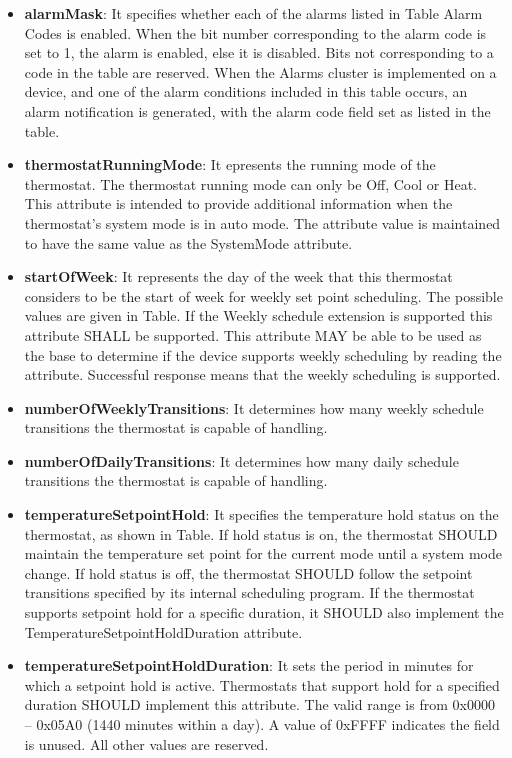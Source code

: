 \begin{itemize}
\item \textbf{alarmMask}: It specifies whether each of the alarms listed in Table Alarm Codes is enabled. When the bit number corresponding to the alarm code is set to 1, the alarm is enabled, else it is disabled. Bits not corresponding to a code in the table are reserved. When the Alarms cluster is implemented on a device, and one of the alarm conditions included in this table occurs, an alarm notification is generated, with the alarm code field set as listed in the table.
\item \textbf{thermostatRunningMode}: It epresents the running mode of the thermostat. The thermostat running mode can only be Off, Cool or Heat. This attribute is intended to provide additional information when the thermostat’s system mode is in auto mode. The attribute value is maintained to have the same value as the SystemMode attribute.
\item \textbf{startOfWeek}: It represents the day of the week that this thermostat considers to be the start of week for weekly set point scheduling. The possible values are given in Table. If the Weekly schedule extension is supported this attribute SHALL be supported. This attribute MAY be able to be used as the base to determine if the device supports weekly scheduling by reading the attribute. Successful response means that the weekly scheduling is supported.
\item \textbf{numberOfWeeklyTransitions}: It determines how many weekly schedule transitions the thermostat is capable of handling.	
\item \textbf{numberOfDailyTransitions}: It determines how many daily schedule transitions the thermostat is capable of handling.
\item \textbf{temperatureSetpointHold}: It specifies the temperature hold status on the thermostat, as shown in Table. If hold status is on, the thermostat SHOULD maintain the temperature set point for the current mode until a system mode change. If hold status is off, the thermostat SHOULD follow the setpoint transitions specified by its internal scheduling program. If the thermostat supports setpoint hold for a specific duration, it SHOULD also implement the TemperatureSetpointHoldDuration attribute.
\item \textbf{temperatureSetpointHoldDuration}: It sets the period in minutes for which a setpoint hold is active. Thermostats that support hold for a specified duration SHOULD implement this attribute. The valid range is from 0x0000 – 0x05A0 (1440 minutes within a day). A value of 0xFFFF indicates the field is unused. All other values are reserved.

\end{itemize}
